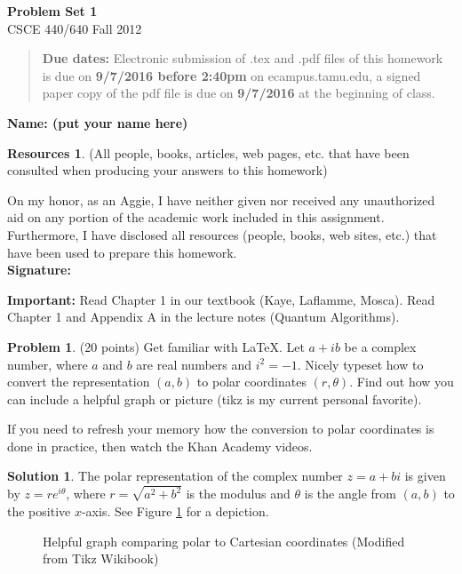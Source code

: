 \documentclass{article}
\theoremstyle{definition}
\newtheorem{problem}{Problem}
\newtheorem*{solution}{Solution}
\newtheorem*{resources}{Resources}
\newcommand{\name}[1]{\noindent\textbf{Name: #1}}
\newcommand{\honor}{\noindent On my honor, as an Aggie, I have neither
  given nor received any unauthorized aid on any portion of the
  academic work included in this assignment. Furthermore, I have
  disclosed all resources (people, books, web sites, etc.) that have
  been used to prepare this homework. \\[1ex]
 \textbf{Signature:} \underline{\hspace*{5cm}} }
\newcommand{\problemset}[1]{\begin{center}\textbf{Problem Set #1}\\ 
CSCE 440/640 Fall 2012\end{center}}
\newcommand{\duedate}[2]{\begin{quote}\textbf{Due dates:} Electronic submission of .tex
    and .pdf files of this homework is due on \textbf{#1} on ecampus.tamu.edu, a signed paper copy
    of the pdf file is due on \textbf{#2} at the beginning of
    class. \end{quote} }
\begin{document}
\problemset{1}
\duedate{9/7/2016 before 2:40pm}{9/7/2016}
\name{ (put your name here)}
\begin{resources} (All people, books, articles, web pages, etc. that
  have been consulted when producing your answers to this homework)
\end{resources}
\honor

\newpage

\textbf{Important: } 
Read Chapter 1 in our textbook (Kaye, Laflamme, Mosca). Read Chapter 1
and Appendix A in the lecture notes (Quantum Algorithms). 

\begin{problem} (20 points) Get familiar with \LaTeX. Let $a+ib$ be a
  complex number, where $a$ and $b$ are real numbers and
  $i^2=-1$. Nicely typeset how to convert the representation $(a,b)$
  to polar coordinates $(r,\theta)$. Find out how you can include a
  helpful graph or picture (tikz is my current personal favorite). 

  If you need to refresh your memory how the conversion to polar
  coordinates is done in practice, then watch the Khan Academy
  videos. 
\end{problem}
\begin{solution}
The polar representation of the complex number $z = a + bi$ is given by
$z = r e^{i \theta}$, where $r = \sqrt{a^2 + b^2}$ is the modulus and
$\theta$ is the angle from $(a,b)$ to the positive $x$-axis.  See Figure \ref{fig:help}
for a depiction.
\begin{figure}
\centering
{}
\caption{Helpful graph comparing polar to Cartesian coordinates (Modified from Tikz Wikibook)}
\label{fig:help}
\end{figure}

\end{solution}
\end{document}
